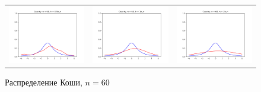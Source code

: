 	\begin{figure}[H]
		\centering
		\begin{tabular}{ccc}
			\includegraphics[width=55mm, height =0.25\textheight]{pics/ker_c_60_1.png}
			&
			\includegraphics[width=55mm, height =0.25\textheight]{pics/ker_c_60_2.png}
			&
			\includegraphics[width=55mm, height =0.25\textheight]{pics/ker_c_60_3.png}
		\end{tabular}
		\caption{Распределение Коши, $n = 60$}
		\label{fig:cauchy}
	\end{figure}

